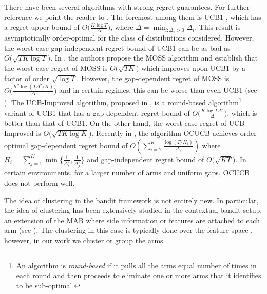 	There have been several algorithms with strong regret guarantees. For further reference we point the reader to \citet{bubeck2012bandits}. The foremost among them is UCB1 \cite{auer2002finite}, which has a regret upper bound of $O\big(\frac{K\log T}{\Delta}\big)$, where $\Delta = \min_{i:\Delta_i>0} \Delta_i$. This result is asymptotically order-optimal for the class of distributions considered. However, the worst case gap independent regret bound of UCB1  can be as bad as $O \big(\sqrt{TK\log T}\big)$.  In \citet{audibert2009minimax}, the authors propose the MOSS algorithm and establish that the worst case regret of MOSS is $O\big(\sqrt{TK}\big)$ which improves upon UCB1 by a factor of order $\sqrt{\log T}$. However, the gap-dependent regret of MOSS is  $O\big(\frac{K^{2}\log\left(T\Delta^{2}/K\right)}{\Delta}\big)$ and in certain regimes, this can be worse than even UCB1 (see \citet{audibert2009minimax,lattimore2015optimally}). The UCB-Improved algorithm, proposed in \citet{auer2010ucb}, is a round-based algorithm\footnote{An algorithm is \textit{round-based} if it pulls all the arms equal number of times in each round and then proceeds to eliminate one or more arms that it identifies to be sub-optimal.} variant of UCB1 that 
has a gap-dependent regret bound of $O\big(\frac{K\log T\Delta^{2}}{\Delta}\big)$, which is better than that of UCB1. On the other hand, the worst case regret of UCB-Improved is $O\big(\sqrt{TK\log K}\big)$. Recently in \citet{lattimore2015optimally}, the algorithm OCUCB achieves order-optimal gap-dependent regret bound of $O\left(\sum_{i=2}^{K}\frac{\log\left(T/H_i\right)}{\Delta_i}\right)$ where $H_i=\sum_{j=1}^{K}\min\lbrace \frac{1}{\Delta_i^2},\frac{1}{\Delta_j^2}\rbrace$ and gap-independent regret bound of $O\big( \sqrt{KT}\big)$. In certain environments, for a larger number of arms and uniform gaps, OCUCB does  not perform well.

The idea of clustering in the bandit framework is not entirely new. In particular, the idea of clustering has been extensively studied in the contextual bandit setup, an extension of the MAB where side information or features are attached to each arm (see  \citet{auer2002using,langford2008epoch,li2010contextual,beygelzimer2011contextual, slivkins2014contextual}). The clustering in this case is typically done over the feature space \cite{bui2012clustered,cesa2013gang,gentile2014online}, however, in our work we cluster or group the arms.  
\vspace*{-0.7em}

